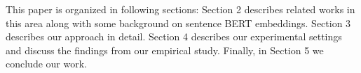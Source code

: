 \documentclass[sigconf,authordraft]{acmart}
\begin{document}
This paper is organized in following sections: Section 2 describes related works in this area along with some background on sentence BERT embeddings. Section 3 describes our approach in detail. Section 4 describes our experimental settings and discuss the findings from our empirical study. Finally, in Section 5 we conclude our work.




\end{document}
